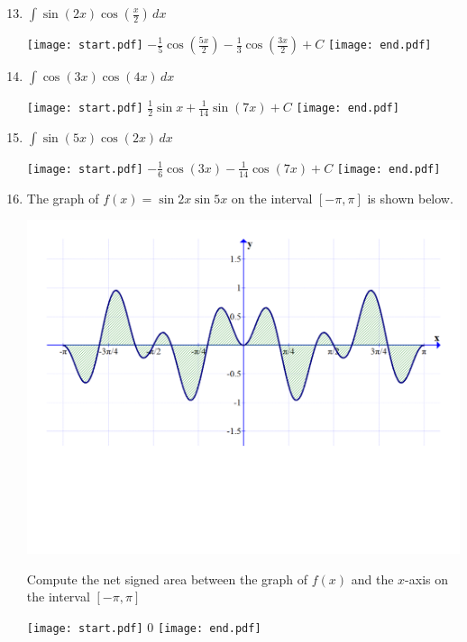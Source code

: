 \documentclass[12pt]{article}
\begin{document}
\begin{enumerate}
\setcounter{enumi}{12}

\item $\int \sin{(2x)}\cos{\left(\frac{x}{2}\right)}\,dx$ 

\texttt{[image: start.pdf]}
{{$-\frac{1}{5}\cos{\left(\frac{5x}{2}\right)}-\frac{1}{3}\cos{\left(\frac{3x}{2}\right)}+C$}}
\texttt{[image: end.pdf]}


\item $\int \cos{(3x)}\cos{(4x)}\,dx$ 

\texttt{[image: start.pdf]}
{{$\frac{1}{2}\sin{x}+\frac{1}{14}\sin{(7x)}+C$}}
\texttt{[image: end.pdf]}


\item $\int \sin{(5x)}\cos{(2x)}\,dx$ 

\texttt{[image: start.pdf]}
{{$-\frac{1}{6}\cos{(3x)}-\frac{1}{14}\cos{(7x)}+C$}}
\texttt{[image: end.pdf]}


\newpage

\item The graph of $f(x)=\sin{2x}\sin{5x}$ on the interval $[-\pi,\pi]$ is shown below.

\begin{center}
\includegraphics[scale=0.3]{graph.pdf}
\end{center}

Compute the net signed area between the graph of $f(x)$ and the $x$-axis on the interval $[-\pi,\pi]$

\texttt{[image: start.pdf]}
{{0}}
\texttt{[image: end.pdf]}


\end{enumerate}
\end{document}
